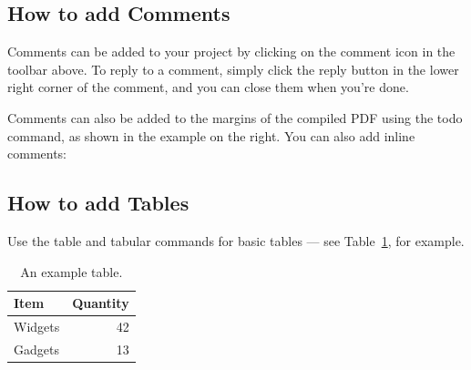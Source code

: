 \documentclass[a4paper]{article}
\begin{document}
\subsection{How to add Comments}

Comments can be added to your project by clicking on the comment icon in the toolbar above. %
%
%
To reply to a comment, simply click the reply button in the lower right corner of the comment, and you can close them when you're done.

Comments can also be added to the margins of the compiled PDF using the todo command, as shown in the example on the right. You can also add inline comments:


\subsection{How to add Tables}

Use the table and tabular commands for basic tables --- see Table~\ref{tab:widgets}, for example. 

\begin{table}[h!]
\centering
\begin{tabular}{l|r}
Item & Quantity \\\hline
Widgets & 42 \\
Gadgets & 13
\end{tabular}
\caption{\label{tab:widgets}An example table.}
\end{table}





\end{document}
